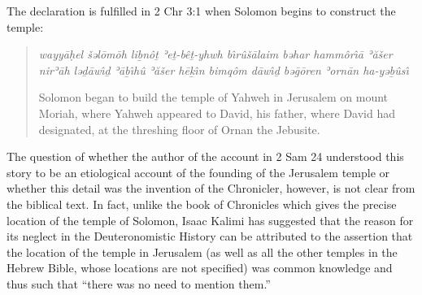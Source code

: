 The declaration is fulfilled in 2 Chr 3:1 when Solomon begins to
construct the temple:

\begin{quote}
\emph{wayyāḥel šəlōmōh liḇnôṯ ʾeṯ-bêṯ-yhwh bı̂rûšālaim bəhar hammôrı̂ā
ʾăšer nirʾāh ləḏāwı̂ḏ ʾāḇı̂hû ʾăšer hēḵı̂n bimqôm dāwı̂ḏ bəḡōren ʾornān
ha-yəḇûsı̂}

Solomon began to build the temple of Yahweh in Jerusalem on mount
Moriah, where Yahweh appeared to David, his father, where David had
designated, at the threshing floor of Ornan the Jebusite.
\end{quote}

The question of whether the author of the account in 2 Sam 24 understood
this story to be an etiological account of the founding of the Jerusalem
temple or whether this detail was the invention of the Chronicler,
however, is not clear from the biblical text. In fact, unlike the book
of Chronicles which gives the precise location of the temple of Solomon,
Isaac Kalimi has suggested that the reason for its neglect in the
Deuteronomistic History can be attributed to the assertion that the
location of the temple in Jerusalem (as well as all the other temples in
the Hebrew Bible, whose locations are not specified) was common
knowledge and thus such that ``there was no need to mention
them.''\autocite[355--356]{kalimi_htr1990}
